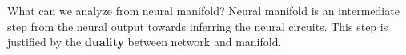 \documentclass[xcolor={dvipsnames,svgnames}]{beamer}
\begin{document}
\begin{frame}{What can we analyze from neural manifold?}
Neural manifold is an intermediate step from the neural output towards inferring the neural circuits. This step is justified by the \textbf{duality} between network and manifold. 
    


\end{frame}
\end{document}
